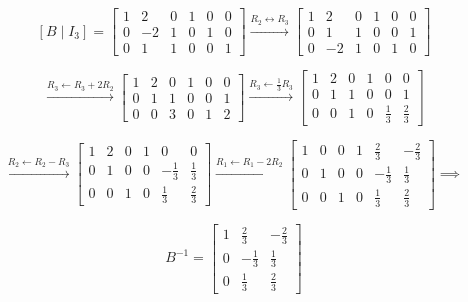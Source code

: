 \begin{answer}
$$
[B\mid I_3]=
\left[
\begin{array}{ccc|ccc}
    1 & 2 & 0 & 1 & 0 & 0\\
    0 & -2 & 1 & 0 & 1 & 0\\
    0 & 1 & 1 & 0 & 0 & 1
\end{array}
\right]
\xrightarrow{R_2\leftrightarrow R_3}
\left[
\begin{array}{ccc|ccc}
    1 & 2 & 0 & 1 & 0 & 0\\
    0 & 1 & 1 & 0 & 0 & 1\\
    0 & -2 & 1 & 0 & 1 & 0
\end{array}
\right]
$$

$$
\xrightarrow{R_3\leftarrow R_3+2R_2}
\left[
\begin{array}{ccc|ccc}
    1 & 2 & 0 & 1 & 0 & 0\\
    0 & 1 & 1 & 0 & 0 & 1\\
    0 & 0 & 3 & 0 & 1 & 2
\end{array}
\right]
\xrightarrow{R_3\leftarrow\frac13R_3}
\left[
\begin{array}{ccc|ccc}
    1 & 2 & 0 & 1 & 0 & 0\\
    0 & 1 & 1 & 0 & 0 & 1\\
    0 & 0 & 1 & 0 & \frac13 & \frac23
\end{array}
\right]
$$

$$
\xrightarrow{R_2\leftarrow R_2-R_3}
\left[
\begin{array}{ccc|ccc}
    1 & 2 & 0 & 1 & 0 & 0\\
    0 & 1 & 0 & 0 & -\frac13 & \frac13\\
    0 & 0 & 1 & 0 & \frac13 & \frac23
\end{array}
\right]
\xrightarrow{R_1\leftarrow R_1-2R_2}
\left[
\begin{array}{ccc|ccc}
    1 & 0 & 0 & 1 & \frac23 & -\frac23\\
    0 & 1 & 0 & 0 & -\frac13 & \frac13\\
    0 & 0 & 1 & 0 & \frac13 & \frac23
\end{array}
\right]
\implies
$$

$$
\boxed{
B^{-1}=
\begin{bmatrix}
    1 & \frac23 & -\frac23\\
    0 & -\frac13 & \frac13\\
    0 & \frac13 & \frac23
\end{bmatrix}
}
$$
\end{answer}
